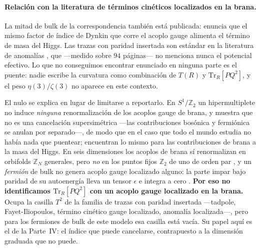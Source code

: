 \documentclass[11pt,a4paper]{article}
\newcommand{\ZZ}{\mathbb{Z}}
\begin{document}
\paragraph{Relación con la literatura de términos cinéticos localizados en la brana.} La mitad de
bulk de la correspondencia también está publicada: \cite{CCP06} enuncia que el mismo factor de
índice de Dynkin que corre el acoplo gauge alimenta el término de masa del Higgs. Las trazas con
paridad insertada son estándar en la literatura de anomalías \cite{vGQ03,SS04}, que ---medido sobre
$94$ páginas--- no menciona nunca el potencial efectivo. Lo que no conseguimos encontrar enunciado en
ninguna parte es el puente: nadie escribe la curvatura como combinación de $T(R)$ y
$\mathrm{Tr}_R[P Q^2]$, y el peso $\eta(3)/\zeta(3)$ no aparece en este contexto.

El nulo se explica en lugar de limitarse a reportarlo. En $S^1/\ZZ_2$ un hipermultiplete no induce
\emph{ninguna} renormalización de los acoplos gauge de brana, y \cite{GNH05} muestra que no es una
cancelación supersimétrica ---las contribuciones bosónica y fermiónica se anulan por separado---, de
modo que en el caso que todo el mundo estudia no había nada que puentear; \cite{vGIQ} encuentran lo
mismo para las contribuciones de brana a la masa del Higgs. En seis dimensiones los acoplos de brana
sí renormalizan en orbifolds $\ZZ_N$ generales, pero \emph{no} en los puntos fijos $\ZZ_2$ de uno de
orden par \cite{GNH05}, y un \emph{fermión} de bulk no genera acoplo gauge localizado alguno: la
parte impar bajo paridad de su autoenergía lleva un tensor $\epsilon$ e integra a cero \cite{GLS06}.
\textbf{Por eso no identificamos $\mathrm{Tr}_R[P Q^2]$ con un acoplo gauge localizado en la brana.}
Ocupa la casilla $T^2$ de la familia de trazas con paridad insertada ---tadpole,
Fayet-Iliopoulos, término cinético gauge localizado, anomalía localizada---, pero para los fermiones
de bulk de este modelo esa casilla está vacía. Su papel aquí es el de la Parte~IV: el índice que
puede cancelarse, contrapuesto a la dimensión graduada que no puede.
\end{document}
